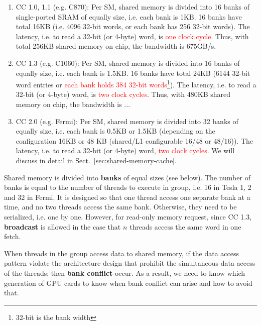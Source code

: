 \begin{enumerate}
\item CC 1.0, 1.1 (e.g. C870): Per SM, shared memory is divided into 16
  banks of single-ported SRAM of equally size, i.e. each bank is
  1KB. 16 banks have total 16KB (i.e. 4096 32-bit words, or each bank
  has 256 32-bit words). The latency, i.e. to read a 32-bit (or
  4-byte) word, is \textcolor{red}{one clock cycle}. Thus, with total
  256KB shared memory on chip, the bandwidth is 675GB/s.

\item CC 1.3 (e.g. C1060): Per SM, shared memory is divided into 16
  banks of equally size, i.e. each bank is 1.5KB. 16 banks have total
  24KB (6144 32-bit word entries or
  \textcolor{red}{each bank holds 384 32-bit
    words}\footnote{32-bit
    is the bank width}).
  The latency, i.e. to read a 32-bit (or 4-byte) word, is
  \textcolor{red}{two clock cycles}. Thus, with 480KB shared memory on
  chip, the bandwidth is ...

\item CC 2.0 (e.g. Fermi): Per SM, shared memory is divided into 32
  banks of equally size, i.e. each bank is 0.5KB or 1.5KB (depending
  on the configuration 16KB or 48 KB (shared/L1 configurable 16/48 or
  48/16)). The latency, i.e. to read a 32-bit (or 4-byte) word,
  \textcolor{red}{two clock cycles}. We will discuss in detail in
  Sect.~\ref{sec:shared-memory-cache}. 
\end{enumerate}

\begin{framed}
  Shared memory is divided into {\bf banks} of equal sizes (see
  below). The number of banks is equal to the number of threads to
  execute in group, i.e. 16 in Tesla 1, 2 and 32 in Fermi. It is
  designed so that one thread access one separate bank at a time, and
  no two threads access the same bank. Otherwise, they need to be
  serialized, i.e. one by one. However, for read-only memory request,
  since CC 1.3, {\bf broadcast} is allowed in the case that $n$
  threads access the same word in one fetch.

  When threads in the group access data to shared memory, if the data
  access pattern violate the architecture design that prohibit the
  simultaneous data access of the threads; then {\bf bank conflict}
  occur. As a result, we need to know which generation of GPU cards to
  know when bank conflict can arise and how to avoid that.

\end{framed}


